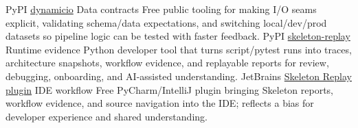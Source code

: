 \documentclass[]{../../../../friggeri-cv}
\begin{document}
\begin{entrylist2}
    \entrytwo
        {\small PyPI}
        {\small \href{https://pypi.org/project/dynamicio/}{dynamicio}}
        {\small Data contracts}
        {\footnotesize Free public tooling for making I/O seams explicit, validating schema/data expectations, and switching local/dev/prod datasets so pipeline logic can be tested with faster feedback.}
    \entrytwo
        {\small PyPI}
        {\small \href{https://pypi.org/project/skeleton-replay/}{skeleton-replay}}
        {\small Runtime evidence}
        {\footnotesize Python developer tool that turns script/pytest runs into traces, architecture snapshots, workflow evidence, and replayable reports for review, debugging, onboarding, and AI-assisted understanding.}
    \entrytwo
        {\small JetBrains}
        {\small \href{https://plugins.jetbrains.com/plugin/32807-skeleton-replay}{Skeleton Replay plugin}}
        {\small IDE workflow}
        {\footnotesize Free PyCharm/IntelliJ plugin bringing Skeleton reports, workflow evidence, and source navigation into the IDE; reflects a bias for developer experience and shared understanding.}
\end{entrylist2}
\end{document}
